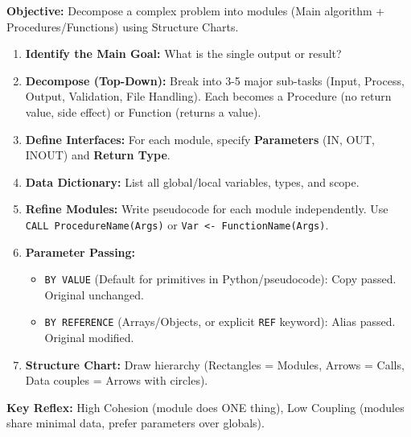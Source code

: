\documentclass[11pt]{article}
\newcommand{\cle}[1]{{\popxbold\color{popdark}#1}}
\begin{document}
\begin{methode}
\textbf{Objective:} Decompose a complex problem into modules (Main algorithm + Procedures/Functions) using Structure Charts.
\begin{enumerate}
    \item \textbf{Identify the Main Goal:} What is the single output or result?
    \item \textbf{Decompose (Top-Down):} Break into 3-5 major sub-tasks (Input, Process, Output, Validation, File Handling). Each becomes a \cle{Procedure} (no return value, side effect) or \cle{Function} (returns a value).
    \item \textbf{Define Interfaces:} For each module, specify \textbf{Parameters} (IN, OUT, INOUT) and \textbf{Return Type}.
    \item \textbf{Data Dictionary:} List all global/local variables, types, and scope.
    \item \textbf{Refine Modules:} Write pseudocode for each module independently. Use \texttt{CALL ProcedureName(Args)} or \texttt{Var <- FunctionName(Args)}.
    \item \textbf{Parameter Passing:}
        \begin{itemize}
            \item \texttt{BY VALUE} (Default for primitives in Python/pseudocode): Copy passed. Original unchanged.
            \item \texttt{BY REFERENCE} (Arrays/Objects, or explicit \texttt{REF} keyword): Alias passed. Original modified.
        \end{itemize}
    \item \textbf{Structure Chart:} Draw hierarchy (Rectangles = Modules, Arrows = Calls, Data couples = Arrows with circles).
\end{enumerate}
\textbf{Key Reflex:} High Cohesion (module does ONE thing), Low Coupling (modules share minimal data, prefer parameters over globals).
\end{methode}
\end{document}
